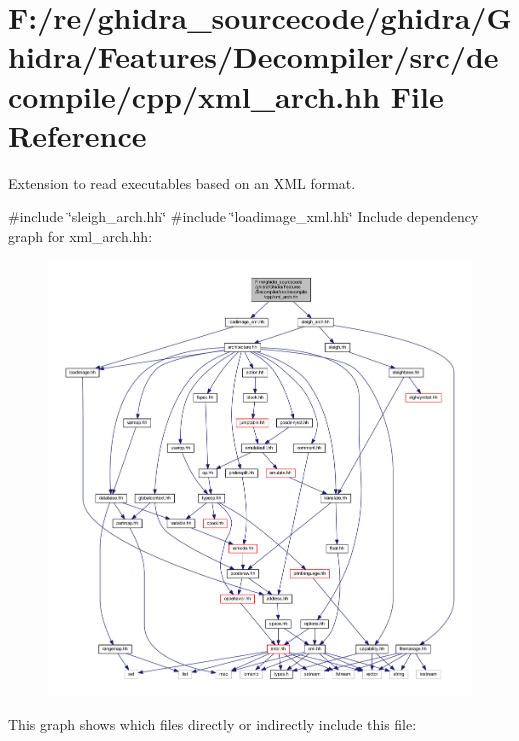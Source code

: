 \hypertarget{xml__arch_8hh}{}\section{F\+:/re/ghidra\+\_\+sourcecode/ghidra/\+Ghidra/\+Features/\+Decompiler/src/decompile/cpp/xml\+\_\+arch.hh File Reference}
\label{xml__arch_8hh}


Extension to read executables based on an X\+ML format.  


{\ttfamily \#include \char`\"{}sleigh\+\_\+arch.\+hh\char`\"{}}\newline
{\ttfamily \#include \char`\"{}loadimage\+\_\+xml.\+hh\char`\"{}}\newline
Include dependency graph for xml\+\_\+arch.\+hh\+:
\nopagebreak
\begin{figure}[H]
\begin{center}
\leavevmode
\includegraphics[width=350pt]{xml__arch_8hh__incl}
\end{center}
\end{figure}
This graph shows which files directly or indirectly include this file\+:
\nopagebreak
